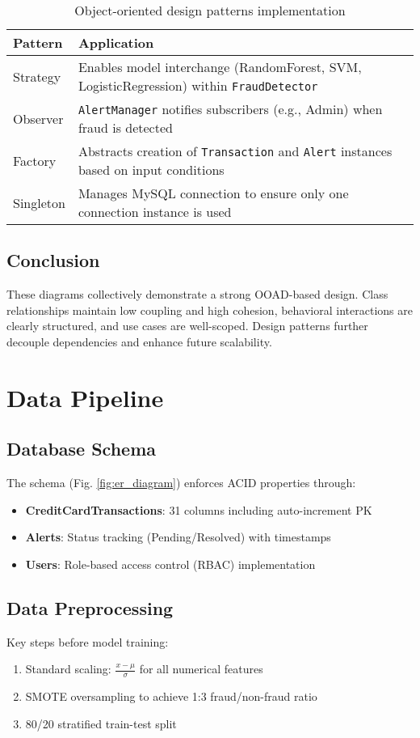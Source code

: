 \documentclass[12pt]{article}
\begin{document}
\begin{table}[h!]
\centering
\begin{tabular}{@{}lp{}@{}}
\toprule
\textbf{Pattern} & \textbf{Application} \\ \midrule
Strategy & Enables model interchange (RandomForest, SVM, LogisticRegression) within \texttt{FraudDetector} \\
Observer & \texttt{AlertManager} notifies subscribers (e.g., Admin) when fraud is detected \\
Factory & Abstracts creation of \texttt{Transaction} and \texttt{Alert} instances based on input conditions \\
Singleton & Manages MySQL connection to ensure only one connection instance is used \\
\bottomrule
\end{tabular}
\caption{Object-oriented design patterns implementation}
\label{tab:patterns}
\end{table}

\subsection{Conclusion}
These diagrams collectively demonstrate a strong OOAD-based design. Class relationships maintain low coupling and high cohesion, behavioral interactions are clearly structured, and use cases are well-scoped. Design patterns further decouple dependencies and enhance future scalability.


\section{Data Pipeline}
\subsection{Database Schema}
The schema (Fig. \ref{fig:er_diagram}) enforces ACID properties through:
\begin{itemize}[leftmargin=*]
    \item \textbf{CreditCardTransactions}: 31 columns including auto-increment PK
    \item \textbf{Alerts}: Status tracking (Pending/Resolved) with timestamps
    \item \textbf{Users}: Role-based access control (RBAC) implementation
\end{itemize}

\subsection{Data Preprocessing}
Key steps before model training:
\begin{enumerate}[leftmargin=*]
    \item Standard scaling: $\frac{x - \mu}{\sigma}$ for all numerical features
    \item SMOTE oversampling to achieve 1:3 fraud/non-fraud ratio
    \item 80/20 stratified train-test split
\end{enumerate}
\end{document}
